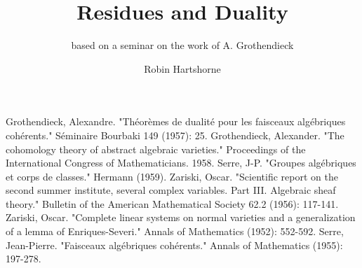 \documentclass[graybox,envcountchap,sectrefs]{svmono}
\begin{document}
\author{Robin Hartshorne}
\title{Residues and Duality}
\subtitle{based on a seminar on the work of A. Grothendieck}
\maketitle

\frontmatter%

% 
% 

% 


\tableofcontents

% 


\mainmatter%
% 


% 
% 

\backmatter%

% 

\biblstarthook{}

\begin{thebibliography}{99.}%
%
%

 Grothendieck, Alexandre. "Théorèmes de dualité pour les faisceaux algébriques cohérents." Séminaire Bourbaki 149 (1957): 25.
 Grothendieck, Alexander. "The cohomology theory of abstract algebraic varieties." Proceedings of the International Congress of Mathematicians. 1958.
 Serre, J-P. "Groupes algébriques et corps de classes." Hermann (1959).
 Zariski, Oscar. "Scientific report on the second summer institute, several complex variables. Part III. Algebraic sheaf theory." Bulletin of the American Mathematical Society 62.2 (1956): 117-141.
 Zariski, Oscar. "Complete linear systems on normal varieties and a generalization of a lemma of Enriques-Severi." Annals of Mathematics (1952): 552-592.
 Serre, Jean-Pierre. "Faisceaux algébriques cohérents." Annals of Mathematics (1955): 197-278.
\end{thebibliography}
\end{document}
